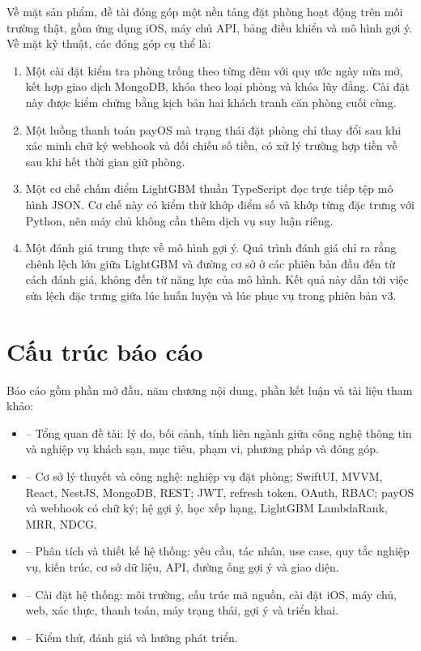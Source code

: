 Về mặt sản phẩm, đề tài đóng góp một nền tảng đặt phòng hoạt động trên môi trường thật, gồm ứng dụng iOS, máy chủ API, bảng điều khiển và mô hình gợi ý. Về mặt kỹ thuật, các đóng góp cụ thể là:

\begin{enumerate}
\item Một cài đặt kiểm tra phòng trống theo từng đêm với quy ước ngày nửa mở, kết hợp giao dịch MongoDB, khóa theo loại phòng và khóa lũy đẳng. Cài đặt này được kiểm chứng bằng kịch bản hai khách tranh căn phòng cuối cùng.
\item Một luồng thanh toán payOS mà trạng thái đặt phòng chỉ thay đổi sau khi xác minh chữ ký webhook và đối chiếu số tiền, có xử lý trường hợp tiền về sau khi hết thời gian giữ phòng.
\item Một cơ chế chấm điểm LightGBM thuần TypeScript đọc trực tiếp tệp mô hình JSON. Cơ chế này có kiểm thử khớp điểm số và khớp từng đặc trưng với Python, nên máy chủ không cần thêm dịch vụ suy luận riêng.
\item Một đánh giá trung thực về mô hình gợi ý. Quá trình đánh giá chỉ ra rằng chênh lệch lớn giữa LightGBM và đường cơ sở ở các phiên bản đầu đến từ cách đánh giá, không đến từ năng lực của mô hình. Kết quả này dẫn tới việc sửa lệch đặc trưng giữa lúc huấn luyện và lúc phục vụ trong phiên bản v3.
\end{enumerate}

\section{Cấu trúc báo cáo}\label{sec:structure}

Báo cáo gồm phần mở đầu, năm chương nội dung, phần kết luận và tài liệu tham khảo:

\begin{itemize}
\item {} -- Tổng quan đề tài: lý do, bối cảnh, tính liên ngành giữa công nghệ thông tin và nghiệp vụ khách sạn, mục tiêu, phạm vi, phương pháp và đóng góp.
\item {} -- Cơ sở lý thuyết và công nghệ: nghiệp vụ đặt phòng; SwiftUI, MVVM, React, NestJS, MongoDB, REST; JWT, refresh token, OAuth, RBAC; payOS và webhook có chữ ký; hệ gợi ý, học xếp hạng, LightGBM LambdaRank, MRR, NDCG.
\item {} -- Phân tích và thiết kế hệ thống: yêu cầu, tác nhân, use case, quy tắc nghiệp vụ, kiến trúc, cơ sở dữ liệu, API, đường ống gợi ý và giao diện.
\item {} -- Cài đặt hệ thống: môi trường, cấu trúc mã nguồn, cài đặt iOS, máy chủ, web, xác thực, thanh toán, máy trạng thái, gợi ý và triển khai.
\item {} -- Kiểm thử, đánh giá và hướng phát triển.
\end{itemize}
